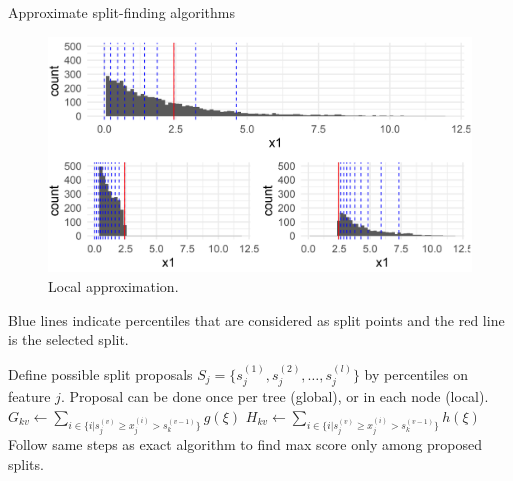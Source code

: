 \begin{vbframe}{Approximate split-finding algorithms}
\begin{small}
\begin{minipage}[b]{0.49\textwidth}
    \end{minipage}
    \begin{minipage}[b]{0.49\textwidth}
      \begin{figure}
        \includegraphics[width=\textwidth]{figure_man/split-finding02.png}
        \caption*{Local approximation.}
      \end{figure}
    \end{minipage}
  \end{small}

  \lz

  Blue lines indicate percentiles that are considered as split points and the red line is the selected split.

  \framebreak

  \begin{algorithm}[H]
    \begin{footnotesize}
      \begin{center}
        \begin{algorithmic}[1]
          \State Define possible split proposals $S_j = \{s_{j}^{(1)}, s_{j}^{(2)}, \hdots, s_{j}^{(l)}\}$ by percentiles on feature $j$.
          \State Proposal can be done once per tree (global), or in each node (local).
          \EndFor
          \State ${G}_{kv} \gets \sum_{i \in \{i|s_j^{(v)} \geq x_j^{(i)} > s_{k}^{(v - 1)}\}} g(\xi)$
          \State ${H}_{kv} \gets \sum_{i \in \{i|s_j^{(v)} \geq x_j^{(i)} > s_{k}^{(v - 1)}\}} h(\xi)$
          \EndFor
          \State Follow same steps as exact algorithm to find max score only among proposed splits.
        \end{algorithmic}
      \end{center}
    \end{footnotesize}
    \caption{Approximate algorithm for split finding}
  \end{algorithm}

\end{vbframe}

